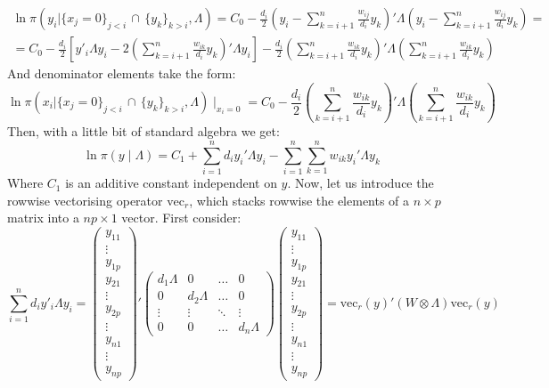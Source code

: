 \documentclass{article}
\begin{document}
\begin{align}
 \ln \pi \left(y_i | \lbrace x_j =0\rbrace_{j<i} \, \cap \, \lbrace y_k \rbrace_{k>i}, \Lambda  \right) =
 C_0 - \frac{d_i}{2 } \left(y_i   -\sum_{k=i+1}^n \frac{w_{ij}}{d_i}y_k  \right) '
 \Lambda  \left(y_i   -\sum_{k=i+1}^n \frac{w_{ij}}{d_i}y_k  \right)=  \\
 = C_0- \frac{d_i}{2 } \left[ y'_i \Lambda y_i - 
 2 \left(\sum_{k=i+1}^n    \frac{w_{ik}}{d_i}y_k\right) ' \Lambda y_i \right] 
 - \frac{d_i}{2}  \left( 
 \sum_{k=i+1}^n \frac{w_{ik}}{d_i} y_k
 \right) ' \Lambda \left( 
 \sum_{k=i+1}^n \frac{w_{ik}}{d_i} y_k
 \right)
 \label{eq:numerator}
 \end{align}
And denominator elements take the form:
\begin{equation}
 \ln \pi \left(x_i | \lbrace x_j =0\rbrace_{j<i} \, \cap \, \lbrace y_k \rbrace_{k>i}, \Lambda  \right)\mid_{x_i=0} = C_0 - \frac{d_i}{2}  \left( 
 \sum_{k=i+1}^n \frac{w_{ik}}{d_i} y_k
 \right) ' \Lambda \left( 
 \sum_{k=i+1}^n \frac{w_{ik}}{d_i} y_k
 \right)
\label{eq:denominator}
\end{equation}
Then, with a little bit of standard algebra we get:
\begin{equation}
\ln \pi(y \mid \Lambda) = C_1 + \sum_{i=1}^n d_i y_i ' \Lambda y_i -
\sum_{i=1}^n \sum_{k=1}^n w_{ik} y_i' \Lambda y_k
\end{equation}
Where $C_1$ is an additive constant independent on $y$. Now, let us introduce the rowwise vectorising operator $\mathrm{vec}_r$, which stacks rowwise the elements of a $n \times p$ matrix into a $np \times 1$ vector. First consider:
$$
 \sum_{i=1}^n d_i y'_i \Lambda y_i = 
\begin{pmatrix}
y_{11} \\ \vdots \\ y_{1p} \\ y_{21} \\ \vdots \\ y_{2p} \\ \vdots \\y_{n1} \\ \vdots \\ y_{np}
\end{pmatrix}'
\begin{pmatrix}
d_1 \Lambda & 0 & \ldots & 0 \\
0 & d_2 \Lambda & \ldots & 0 \\
\vdots & \vdots & \ddots & \vdots \\
0 & 0 & \ldots & d_n \Lambda
\end{pmatrix}
\begin{pmatrix}
y_{11} \\ \vdots \\ y_{1p} \\ y_{21} \\ \vdots \\ y_{2p} \\ \vdots \\y_{n1} \\ \vdots \\ y_{np}
\end{pmatrix}  = 
\mathrm{vec}_r(y) ' (W \otimes \Lambda) \mathrm{vec}_r(y)
$$
\end{document}
